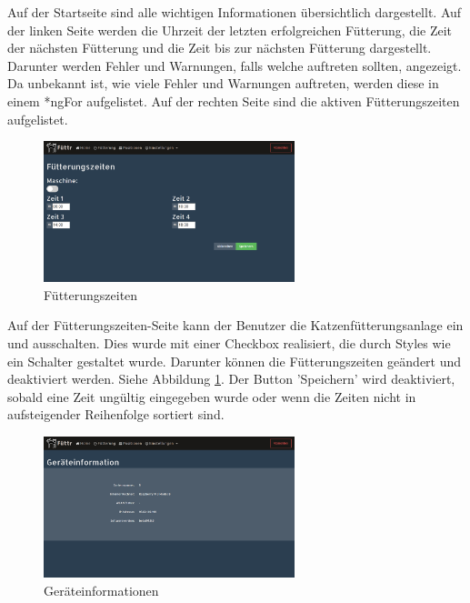 Auf der Startseite sind alle wichtigen Informationen übersichtlich dargestellt. Auf der linken Seite werden die Uhrzeit der letzten erfolgreichen Fütterung, die Zeit der nächsten Fütterung und die Zeit bis zur nächsten Fütterung dargestellt. Darunter werden Fehler und Warnungen, falls welche auftreten sollten, angezeigt. Da unbekannt ist, wie viele Fehler und Warnungen auftreten, werden diese in einem *ngFor aufgelistet. Auf der rechten Seite sind die aktiven Fütterungszeiten aufgelistet. \newpage

\begin{figure}
\vspace{-10pt}
  \begin{center}
    \includegraphics[width=0.65\textwidth]{Bilder/Greistorfer/Fuetterungszeiten}
  \end{center}
  \caption{Fütterungszeiten}
  \label{Fütterungszeiten}
  \vspace{-10pt}
\end{figure}

Auf der Fütterungszeiten-Seite kann der Benutzer die Katzenfütterungsanlage ein und ausschalten. Dies wurde mit einer Checkbox realisiert, die durch Styles wie ein Schalter gestaltet wurde. Darunter können die Fütterungszeiten geändert und deaktiviert werden. Siehe Abbildung \ref{Fütterungszeiten}. Der Button 'Speichern' wird deaktiviert, sobald eine Zeit ungültig eingegeben wurde oder wenn die Zeiten nicht in aufsteigender Reihenfolge sortiert sind. \\

\begin{figure}
\vspace{-10pt}
  \begin{center}
    \includegraphics[width=0.65\textwidth]{Bilder/Greistorfer/Gerateinformation}
  \end{center}
  \caption{Geräteinformationen}
  \label{Geräteinformationen}
  \vspace{-60pt}
\end{figure}

